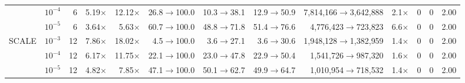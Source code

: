 \begin{tabular}{@{}llrrrrrrrrrrr@{}}
 & $10^{-4}$ & 6 & 5.19$\times$ & 12.12$\times$ & 26.8$\to$100.0 & 10.3$\to$38.1 & 12.9$\to$50.9 & 7{,}814{,}166$\to$3{,}642{,}888 & 2.1$\times$ & 0 & 0 & 2.00 \\
 & $10^{-5}$ & 6 & 3.64$\times$ & 5.63$\times$ & 60.7$\to$100.0 & 48.8$\to$71.8 & 51.4$\to$76.6 & 4{,}776{,}423$\to$723{,}823 & 6.6$\times$ & 0 & 0 & 2.00 \\
\midrule
SCALE & $10^{-3}$ & 12 & 7.86$\times$ & 18.02$\times$ & 4.5$\to$100.0 & 3.6$\to$27.1 & 3.6$\to$30.6 & 1{,}948{,}128$\to$1{,}382{,}959 & 1.4$\times$ & 0 & 0 & 2.00 \\
 & $10^{-4}$ & 12 & 6.17$\times$ & 11.75$\times$ & 22.1$\to$100.0 & 23.0$\to$47.8 & 22.9$\to$50.4 & 1{,}541{,}726$\to$987{,}320 & 1.6$\times$ & 0 & 0 & 2.00 \\
 & $10^{-5}$ & 12 & 4.82$\times$ & 7.85$\times$ & 47.1$\to$100.0 & 50.1$\to$62.7 & 49.9$\to$64.7 & 1{,}010{,}954$\to$718{,}532 & 1.4$\times$ & 0 & 0 & 2.00 \\
\bottomrule
\end{tabular}
